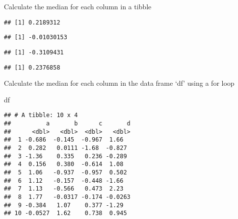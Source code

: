 \documentclass[
]{article}
\newenvironment{Shaded}{\begin{snugshade}}{\end{snugshade}}
\newcommand{\FunctionTok}[1]{\textcolor[rgb]{0.13,0.29,0.53}{\textbf{#1}}}
\newcommand{\NormalTok}[1]{#1}
\newcommand{\SpecialCharTok}[1]{\textcolor[rgb]{0.81,0.36,0.00}{\textbf{#1}}}
\begin{document}
Calculate the median for each column in a tibble

\begin{Shaded}
\end{Shaded}

\begin{verbatim}
## [1] 0.2189312
\end{verbatim}

\begin{Shaded}
\end{Shaded}

\begin{verbatim}
## [1] -0.01030153
\end{verbatim}

\begin{Shaded}
\end{Shaded}

\begin{verbatim}
## [1] -0.3109431
\end{verbatim}

\begin{Shaded}
\end{Shaded}

\begin{verbatim}
## [1] 0.2376858
\end{verbatim}

Calculate the median for each column in the data frame `df' using a for
loop

\begin{Shaded}
\begin{Highlighting}[]
\NormalTok{df}
\end{Highlighting}
\end{Shaded}

\begin{verbatim}
## # A tibble: 10 x 4
##          a       b      c       d
##      <dbl>   <dbl>  <dbl>   <dbl>
##  1 -0.686  -0.145  -0.967  1.66  
##  2  0.282   0.0111 -1.68  -0.827 
##  3 -1.36    0.335   0.236 -0.289 
##  4  0.156   0.380  -0.614  1.08  
##  5  1.06   -0.937  -0.957  0.502 
##  6  1.12   -0.157  -0.448 -1.66  
##  7  1.13   -0.566   0.473  2.23  
##  8  1.77   -0.0317 -0.174 -0.0263
##  9 -0.384   1.07    0.377 -1.29  
## 10 -0.0527  1.62    0.738  0.945
\end{verbatim}
\end{document}

